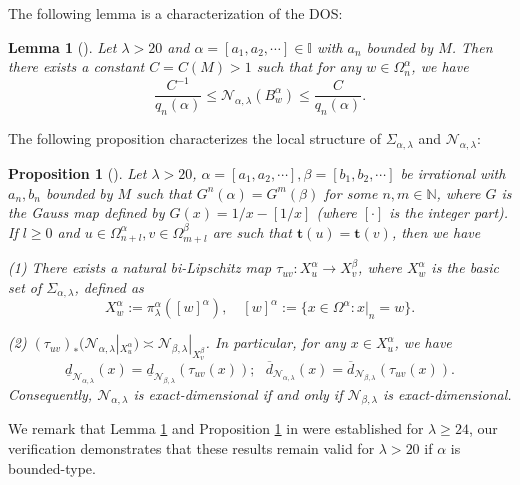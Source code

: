 \documentclass[reqno,11pt,graphicx,]{amsart}
\numberwithin{equation}{section}
\theoremstyle{plain}
\newcommand{\I}{{\mathbb I}}
\newcommand{\3}{\mathbf{3}}
\newtheorem{proposition}[theorem]{Proposition}
\newtheorem{lemma}[theorem]{Lemma}
\begin{document}
	The following lemma is a characterization of the DOS:
	\begin{lemma}[]\label{dos-measure} 
		Let $\lambda>20$ and $\alpha=[a_1,a_2,\cdots]\in\I$ with $a_n$ bounded by $M$. Then there exists a constant $C=C(M)>1$ such that for any $w\in\Omega^{\alpha}_n$, we have 
		\begin{equation*}  \label{def-C-i}
			\frac{C^{-1}}{q_{n}(\alpha)}\leq\mathcal{N}_{\alpha,\lambda}(B^{\alpha}_{w})\leq\frac{C}{q_{n}(\alpha)}.
		\end{equation*}
	\end{lemma}
	The following proposition characterizes the local structure of $\Sigma_{\alpha,\lambda}$ and $\mathcal{N}_{\alpha,\lambda}$:
	\begin{proposition}[]\label{geo-lem-tail}
		Let $\lambda>20$, $\alpha=[a_1,a_2,\cdots],\beta=[b_1,b_2,%
		\cdots]$ be irrational with $a_n,b_n$ bounded by $M$ such
		that $G^n(\alpha)=G^m(\beta)$ for some $n,m\in {\mathbb{N}}$, where $G$ is the Gauss map defined by $G(x)=1/x-[1/x]$ (where $[\cdot]$ is the integer part). If $l\ge0$
		and $u\in \Omega^{\alpha}_{n+l}, v\in \Omega^{\beta}_{m+l}$ are such that $		\mathbf{t}(u)=\mathbf{t}(v)$, then we have
		
		(1)  There exists a natural bi-Lipschitz map $\tau_{uv}:X_u^{\alpha}\to X_v^{\beta}$, where $X^{\alpha}_w$ is the \textit{basic set} of $\Sigma_{\alpha,\lambda}$, defined as 
		\begin{equation}  \label{def-basic-set}
			X_w^{\alpha}:=\pi^{\alpha}_\lambda([w]^{\alpha}),\quad [w]^{\alpha}:=\{x\in \Omega^{\alpha}: x|_n=w\}.
		\end{equation}
		
		(2) $(\tau_{uv})_*(\mathcal{N}_{\alpha,\lambda}|_{X_u^\alpha})\asymp \mathcal{N}_{\beta,\lambda}|_{X_v^\beta}$. In particular, for any $x\in X_u^\alpha$, we have
		\begin{equation*}\label{equal-loc-dim}
			\underline{d}_{\mathcal{N}_{\alpha,\lambda}}(x)=\underline{d}_{\mathcal{N}_{\beta,\lambda}}(\tau_{uv}(x));\ \ \
			\overline{d}_{\mathcal{N}_{\alpha,\lambda}}(x)=\overline{d}_{\mathcal{N}_{\beta,\lambda}}(\tau_{uv}(x)).
		\end{equation*}
		Consequently, $\mathcal{N}_{\alpha,\lambda}$ is exact-dimensional if and only if $\mathcal{N}_{\beta,\lambda}$ is exact-dimensional.
	\end{proposition}
	We remark that Lemma \ref{dos-measure} and Proposition \ref{geo-lem-tail} in \cite{CQ2023} were established for $\lambda\geq24$, our verification demonstrates that these results remain valid for $\lambda>20$ if $\alpha$ is bounded-type.
	
\end{document}
